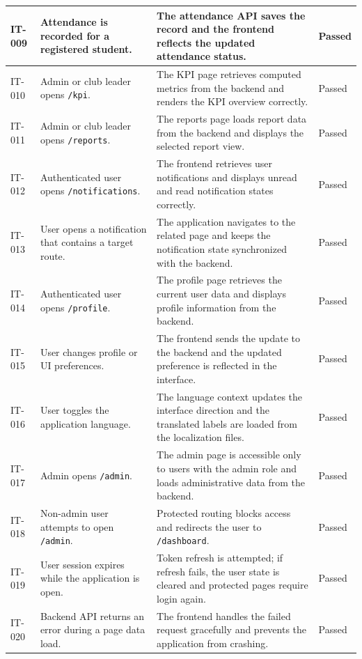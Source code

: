 \begin{longtable}{|p{}|p{}|p{}|p{}|}
\hline
IT-009 & Attendance is recorded for a registered student. & The attendance API saves the record and the frontend reflects the updated attendance status. & Passed \\
\hline
IT-010 & Admin or club leader opens \texttt{/kpi}. & The KPI page retrieves computed metrics from the backend and renders the KPI overview correctly. & Passed \\
\hline
IT-011 & Admin or club leader opens \texttt{/reports}. & The reports page loads report data from the backend and displays the selected report view. & Passed \\
\hline
IT-012 & Authenticated user opens \texttt{/notifications}. & The frontend retrieves user notifications and displays unread and read notification states correctly. & Passed \\
\hline
IT-013 & User opens a notification that contains a target route. & The application navigates to the related page and keeps the notification state synchronized with the backend. & Passed \\
\hline
IT-014 & Authenticated user opens \texttt{/profile}. & The profile page retrieves the current user data and displays profile information from the backend. & Passed \\
\hline
IT-015 & User changes profile or UI preferences. & The frontend sends the update to the backend and the updated preference is reflected in the interface. & Passed \\
\hline
IT-016 & User toggles the application language. & The language context updates the interface direction and the translated labels are loaded from the localization files. & Passed \\
\hline
IT-017 & Admin opens \texttt{/admin}. & The admin page is accessible only to users with the admin role and loads administrative data from the backend. & Passed \\
\hline
IT-018 & Non-admin user attempts to open \texttt{/admin}. & Protected routing blocks access and redirects the user to \texttt{/dashboard}. & Passed \\
\hline
IT-019 & User session expires while the application is open. & Token refresh is attempted; if refresh fails, the user state is cleared and protected pages require login again. & Passed \\
\hline
IT-020 & Backend API returns an error during a page data load. & The frontend handles the failed request gracefully and prevents the application from crashing. & Passed \\
\hline

\end{longtable}
